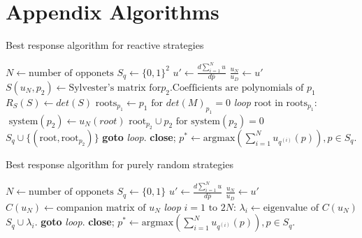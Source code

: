 
\section{Appendix Algorithms}

\begin{algorithm}
    \caption{Best response algorithm for reactive strategies}\label{algo:reactive}
    \begin{algorithmic}[1]
    \State $N \gets \text{number of opponets}$ 
    \State $S_q \gets \{0, 1\} ^ 2$ 
    \State $u' \gets \frac{d\sum\limits_{i=1} ^ {N}u}{d\bar{p}}$ 
    \State $\frac{u_N}{u_D} \gets u'$ 
    \State $S(u_N, p_2) \gets \text{Sylvester's matrix for} p_2. \text{Coefficients are polynomials of } p_1$
    \State $R_S(S) \gets det(S)$
    \State $\text{roots}_{p_1} \gets p_1 \text{ for } det(M)_{p_1} = 0$
    \BState \emph{loop} $\text{root in roots}_{p_1}$:
    \State $\text{ system}(p_2) \gets u_N (root)$
    \State $\text{root}_{p_2} \cup {p_2} \text{ for } \text{system}(p_2) = 0$
    \State $S_q \cup \{(\text{root}, \text{root}_{p_2})\}$
    \EndIf
    \State \textbf{goto} \emph{loop}.
    \State \textbf{close};
    \State $p^* \gets \text{argmax}(\sum\limits_{i=1} ^ {N} u_{q^{(i)}} (p)), p \in S_q$.
    \EndProcedure
    \end{algorithmic}
\end{algorithm}

\begin{algorithm}
    \caption{Best response algorithm for purely random strategies}\label{algo:purely}
    \begin{algorithmic}[1]
    \State $N \gets \text{number of opponets}$ 
    \State $S_q \gets \{0, 1\}$ 
    \State $u' \gets \frac{d\sum\limits_{i=1} ^ {N}u}{d\bar{p}}$ 
    \State $\frac{u_N}{u_D} \gets u'$ 
    \State $C(u_N) \gets \text{companion matrix of } u_N$
    \BState \emph{loop} $i=1 \text{ to } 2N$:
    \State $\lambda_i \gets \text{eigenvalue of } C(u_N)$
    \State $S_q \cup \lambda_i $.
    \EndIf
    \State \textbf{goto} \emph{loop}.
    \State \textbf{close};
    \State $p^* \gets \text{argmax}(\sum\limits_{i=1} ^ {N} u_{q^{(i)}} (p)), p \in S_q $.
    \EndProcedure
    \end{algorithmic}
\end{algorithm}